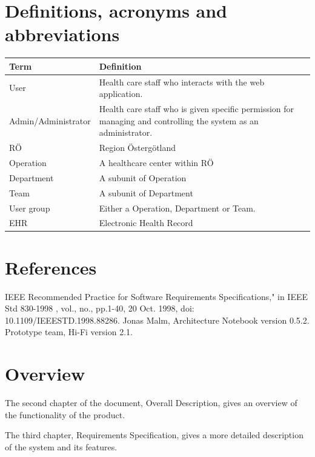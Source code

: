 \documentclass{scrreprt}
\begin{document}
\section{Definitions, acronyms and abbreviations}
\label{section:def}
\begin{center}
\begin{tabularx}{\linewidth}{| l | X |}
 \hline
 \textbf{Term} & \textbf{Definition} \\ 
 \hline
  User  & Health care staff who interacts with the web application.  \\
  \hline
  Admin/Administrator & Health care staff who is given specific permission for managing and controlling the system as an administrator.  \\ 
  \hline
  RÖ  & Region Östergötland  \\ 
  \hline
   Operation & A healthcare center within RÖ \\ 
  \hline 
  Department & A subunit of Operation \\
  \hline
  Team & A subunit of Department \\ 
  \hline
  User group & Either a Operation, Department or Team. \\ 
  \hline
  EHR & Electronic Health Record \\ 
  \hline
\end{tabularx}
\end{center}

\section{References}
IEEE Recommended Practice for Software Requirements Specifications," in IEEE Std 830-1998 , vol., no., pp.1-40, 20 Oct. 1998, doi: 10.1109/IEEESTD.1998.88286.
\newline
\newline
Jonas Malm, Architecture Notebook version 0.5.2.
\newline
\newline
Prototype team, Hi-Fi version 2.1. 

\section{Overview}
The second chapter of the document, Overall Description, gives an overview of the functionality of the product.


The third chapter, Requirements Specification, gives a more  detailed description of the system and its features. 
\end{document}

